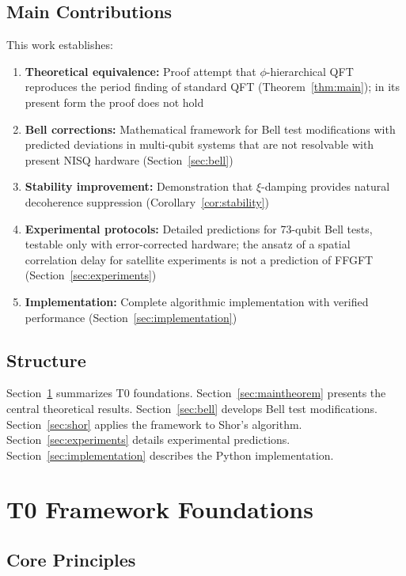 \subsection{Main Contributions}

This work establishes:

\begin{enumerate}
	\item \textbf{Theoretical equivalence:} Proof attempt that $\phi$-hierarchical QFT reproduces the period finding of standard QFT (Theorem~\ref{thm:main}); in its present form the proof does not hold
	\item \textbf{Bell corrections:} Mathematical framework for Bell test modifications with predicted deviations in multi-qubit systems that are not resolvable with present NISQ hardware (Section~\ref{sec:bell})
	\item \textbf{Stability improvement:} Demonstration that $\xi$-damping provides natural decoherence suppression (Corollary~\ref{cor:stability})
	\item \textbf{Experimental protocols:} Detailed predictions for 73-qubit Bell tests, testable only with error-corrected hardware; the ansatz of a spatial correlation delay for satellite experiments is not a prediction of FFGFT (Section~\ref{sec:experiments})
	\item \textbf{Implementation:} Complete algorithmic implementation with verified performance (Section~\ref{sec:implementation})
\end{enumerate}

\subsection{Structure}

Section~\ref{sec:t0framework} summarizes T0 foundations. Section~\ref{sec:maintheorem} presents the central theoretical results. Section~\ref{sec:bell} develops Bell test modifications. Section~\ref{sec:shor} applies the framework to Shor's algorithm. Section~\ref{sec:experiments} details experimental predictions. Section~\ref{sec:implementation} describes the Python implementation.

\section{T0 Framework Foundations}
\label{sec:t0framework}

\subsection{Core Principles}

